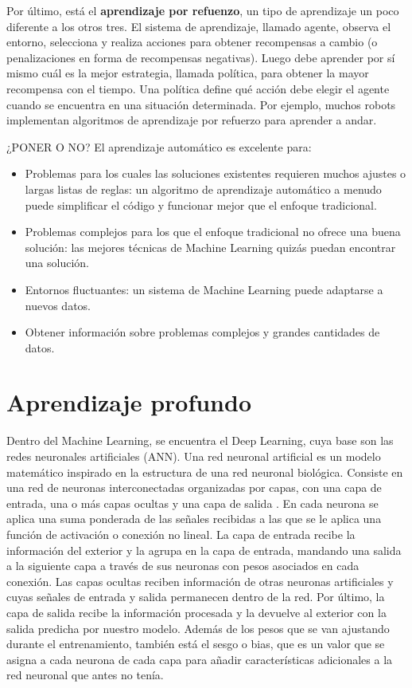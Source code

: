 Por último, está el \textbf{aprendizaje por refuenzo}, un tipo de aprendizaje un poco diferente a los otros tres.  El sistema de aprendizaje, llamado agente, observa el entorno, selecciona y realiza acciones para obtener recompensas a cambio (o penalizaciones en forma de recompensas negativas). Luego debe aprender por sí mismo cuál es la mejor estrategia, llamada política, para obtener la mayor recompensa con el tiempo. Una política define qué acción debe elegir el agente cuando se encuentra en una situación determinada. Por ejemplo, muchos robots implementan algoritmos de aprendizaje por refuerzo para aprender a andar.






¿PONER O NO?
El aprendizaje automático es excelente para:

\begin{itemize}
\item Problemas para los cuales las soluciones existentes requieren muchos ajustes o largas listas de reglas: un algoritmo de aprendizaje automático a menudo puede simplificar el código y funcionar mejor que el enfoque tradicional.

\item Problemas complejos para los que el enfoque tradicional no ofrece una buena solución: las mejores técnicas de Machine Learning quizás puedan encontrar una solución.

\item Entornos fluctuantes: un sistema de Machine Learning puede adaptarse a nuevos datos.

\item Obtener información sobre problemas complejos y grandes cantidades de datos.
\end{itemize}


\section{Aprendizaje profundo}

Dentro del Machine Learning, se encuentra el Deep Learning, cuya base son las redes neuronales artificiales (ANN). Una red neuronal artificial es un modelo matemático inspirado en la estructura de una red neuronal biológica. Consiste en una red de neuronas interconectadas organizadas por capas, con una capa de entrada, una o más capas ocultas y una capa de salida \citep{dolling2002artificial}. En cada neurona se aplica una suma ponderada de las señales recibidas a las que se le aplica una función de activación o conexión no lineal. La capa de entrada recibe la información del exterior y la agrupa en la capa de entrada, mandando una salida a la siguiente capa a través de sus neuronas con pesos asociados en cada conexión. Las capas ocultas reciben información de otras neuronas artificiales y cuyas señales de entrada y salida permanecen dentro de la red. Por último, la capa de salida recibe la información procesada y la devuelve al exterior con la salida predicha por nuestro modelo. Además de los pesos que se van ajustando durante el entrenamiento, también está el sesgo o bias, que es un valor que se asigna a cada neurona de cada capa para añadir características adicionales a la red neuronal que antes no tenía. 


